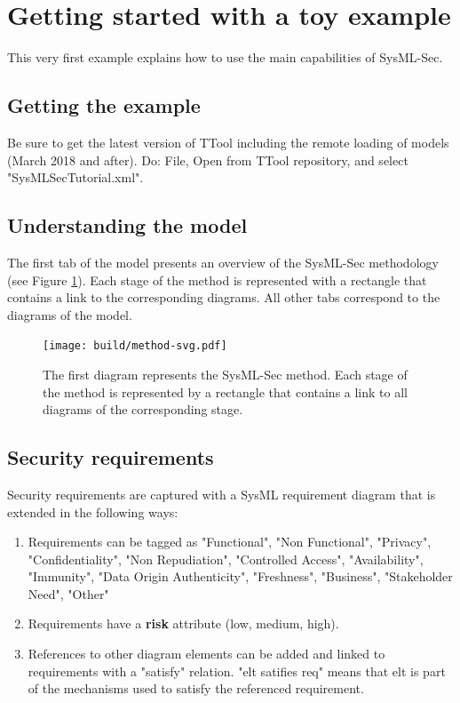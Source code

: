 \documentclass[12pt]{article}
\begin{document}
\newpage
\section{Getting started with a toy example}\label{sec:example}
This very first example explains how to use the main capabilities of SysML-Sec.

\subsection{Getting the example}
Be sure to get the latest version of TTool including the remote loading of models (March 2018 and after). Do: File, Open from TTool repository, and select "SysMLSecTutorial.xml".

\subsection{Understanding the model}
The first tab of the model presents an overview of the SysML-Sec methodology (see Figure \ref{fig:method}). Each stage of the method is represented with a rectangle that contains a link to the corresponding diagrams.  All other tabs correspond to the diagrams of the model.


\begin{figure}[htbp]
\centering
\texttt{[image: build/method-svg.pdf]}

\caption{The first diagram represents the SysML-Sec method. Each stage of the method is represented by a rectangle that contains a link to all diagrams of the corresponding stage.} \label{fig:method}
\end{figure}

\subsection{Security requirements}
Security requirements are captured with a SysML requirement diagram that is extended in the following ways:
\begin{enumerate}
\item Requirements can be tagged as "Functional", "Non Functional", "Privacy", "Confidentiality", "Non Repudiation", "Controlled Access", "Availability", "Immunity", "Data Origin Authenticity", "Freshness", "Business", "Stakeholder Need", "Other"
\item Requirements have a \textbf{risk} attribute (low, medium, high).
\item References to other diagram elements can be added and linked to requirements with a "satisfy" relation. "elt satifies req" means that elt is part of the mechanisms used to satisfy the referenced requirement.
\end{enumerate}
\end{document}
